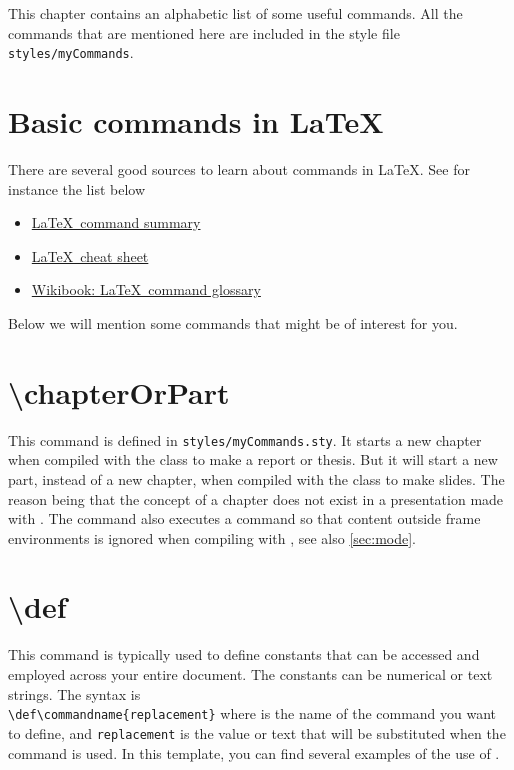 \label{ch:usefulcommands}
This chapter contains an alphabetic list of some useful commands. All the commands that are mentioned here are included in the style file \verb|styles/myCommands|.

\section{Basic commands in \LaTeX}
There are several good sources to learn about commands in \LaTeX. See for instance the list below
\begin{itemize}
    \item \href{https://www.ntg.nl/doc/biemesderfer/ltxcrib.pdf}{\LaTeX\ command summary}
    \item \href{https://wch.github.io/latexsheet/}{\LaTeX\ cheat sheet}
    \item \href{https://en.wikibooks.org/wiki/LaTeX/Command_Glossary}{Wikibook: \LaTeX\ command glossary} 
\end{itemize}

Below we will mention some commands that might be of interest for you.

\section{\textbackslash chapterOrPart}
This command is defined in \texttt{styles/myCommands.sty}. It starts a new chapter when compiled with the class  to make a report or thesis. But it will start a new part, instead of a new chapter, when compiled with the class  to make slides. The reason being that the concept of a chapter does not exist in a presentation made with . The  command also executes a  command so that content outside frame environments is ignored when compiling with , see also \cref{sec:mode}.

\section{\textbackslash def}
This command is typically used to define constants that can be accessed and employed across your entire document. The constants can be numerical or text strings. The syntax is\\ \verb|\def\commandname{replacement}| where  is the name of the command you want to define, and \texttt{replacement} is the value or text that will be substituted when the command is used. In this template, you can find several examples of the use of .


